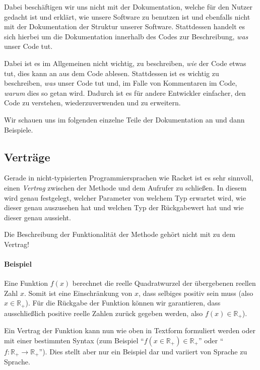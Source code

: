 
Dabei beschäftigen wir uns nicht mit der Dokumentation, welche für den Nutzer gedacht ist und erklärt, wie unsere Software zu benutzen ist und ebenfalls nicht mit der Dokumentation der Struktur unserer Software. Stattdessen handelt es sich hierbei um die Dokumentation innerhalb des Codes zur Beschreibung, \textit{was} unser Code tut.

Dabei ist es im Allgemeinen nicht wichtig, zu beschreiben, \textit{wie} der Code etwas tut, dies kann an aus dem Code ablesen. Stattdessen ist es wichtig zu beschreiben, \textit{was} unser Code tut und, im Falle von Kommentaren im Code, \textit{warum} dies so getan wird. Dadurch ist es für andere Entwickler einfacher, den Code zu verstehen, wiederzuverwenden und zu erweitern.


Wir schauen uns im folgenden einzelne Teile der Dokumentation an und dann Beispiele.

\subsection{Verträge} \functionalMark \imperativeMark \oopMark

	Gerade in nicht-typisierten Programmiersprachen wie Racket ist es sehr sinnvoll, einen \textit{Vertrag} zwischen der Methode und dem Aufrufer zu schließen. In diesem wird genau festgelegt, welcher Parameter von welchem Typ erwartet wird, wie dieser genau auszusehen hat und welchen Typ der Rückgabewert hat und wie dieser genau aussieht.
	
	Die Beschreibung der Funktionalität der Methode gehört nicht mit zu dem Vertrag!
	
	\paragraph{Beispiel}
		Eine Funktion \(f(x)\) berechnet die reelle Quadratwurzel der übergebenen reellen Zahl \(x\). Somit ist eine Einschränkung von \(x\), dass selbiges positiv sein muss (also \(x \in \mathbb{R} _ +\)). Für die Rückgabe der Funktion können wir garantieren, dass ausschließlich positive reelle Zahlen zurück gegeben werden, also \(f(x) \in \mathbb{R} _ +\)).
		
		Ein Vertrag der Funktion kann nun wie oben in Textform formuliert werden oder mit einer bestimmten Syntax (zum Beispiel \enquote{\( f(x \in \mathbb{R} _ +) \in \mathbb{R} _ + \)} oder \enquote{\( f : \mathbb{R} _ + \rightarrow \mathbb{R} _ + \)}). Dies stellt aber nur ein Beispiel dar und variiert von Sprache zu Sprache.

